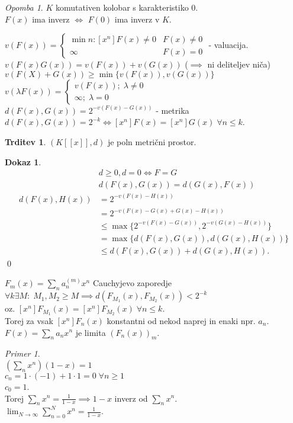 \documentclass[a4paper, 12pt]{book}
\theoremstyle{definition}
\newtheorem{claim}[counter]{Trditev}
\newtheorem{pro}[counter]{Dokaz}
\theoremstyle{remark}
\newtheorem*{ex}{Primer}
\newtheorem*{rem}{Opomba}
\begin{document}
\begin{rem}
  $K$ komutativen kolobar s karakteristiko $0$. \\
  $F(x)$ ima inverz $\iff$ $F(0)$ ima inverz v $K$.
\end{rem}
$v(F(x)) = \begin{cases}
  \min n: [x^n]F(x) \neq 0 &F(x) \neq 0 \\
  \infty &F(x) = 0
\end{cases}$ - valuacija. \\
$v(F(x) G(x)) = v(F(x)) + v(G(x))$ ($\implies$ ni deliteljev niča) \\
$v(F(X) + G(x)) \geq \min \{v(F(x)), v(G(x))\}$ \\
$v(\lambda F(x)) = \begin{cases}
  v(F(x)); \; \lambda \neq 0 \\
  \infty; \; \lambda = 0
\end{cases}$ \\
$d(F(x), G(x)) = 2^{-v(F(x) - G(x))}$ - metrika \\
$d(F(x), G(x)) = 2^{-k} \iff [x^n] F(x) = [x^n] G(x) \; \forall n \leq k$.
\begin{claim}
  $(K[[x]], d)$ je poln metrični prostor.
\end{claim}
\begin{pro}
  \begin{align*}
    &d \geq 0, d = 0 \iff F = G \\
    &d(F(x), G(x)) = d(G(x), F(x)) \\
    d(F(x), H(x)) &= 2^{-v(F(x) - H(x))} \\
    &= 2^{-v(F(x) - G(x) + G(x) - H(x))} \\
    &\leq \max \{2^{-v(F(x) - G(x))}, 2^{-v(G(x) - H(x))}\} \\
    &= \max \{d(F(x), G(x)), d(G(x), H(x))\} \\
    &\leq d(F(x), G(x)) + d(G(x), H(x)).
  \end{align*}
  \qed
\end{pro}
$F_m(x) = \sum_n a_n^{(m)} x^n$ Cauchyjevo zaporedje \\
$\forall k \exists M: \; M_1, M_2 \geq M \implies d(F_{M_1}(x), F_{M_2}(x)) < 2^{-k}$ \\
oz. $[x^n] F_{M_1} (x) = [x^n] F_{M_2} (x) \; \forall n \leq k$. \\
Torej za vsak $[x^n] F_n(x)$ konstantni od nekod naprej in enaki npr. $a_n$. \\
$F(x) = \sum_n a_n x^n$ je limita $(F_n(x))_m$.
\begin{ex} \text{} \\
  $\left(\sum_n x^n\right) (1-x) = 1$ \\
  $c_n = 1 \cdot (-1) + 1 \cdot 1 = 0 \; \forall n \geq 1$ \\
  $c_0 = 1$. \\
  Torej $\sum_n x^n = \frac{1}{1-x} \implies 1-x$ inverz od $\sum_n x^n$. \\
  $\lim_{N \to \infty} \sum_{n=0}^{N} x^n = \frac{1}{1-x}$. \\
\end{ex}
\end{document}
